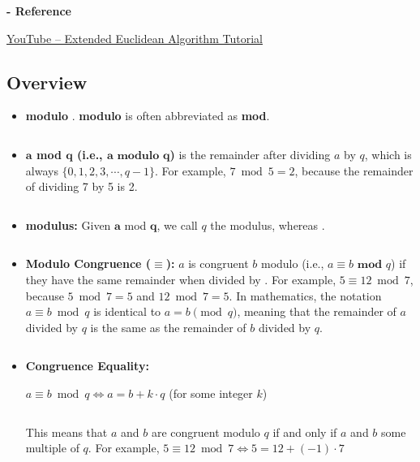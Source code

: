 
\noindent \textbf{- Reference} 

\href{https://www.youtube.com/watch?v=fz1vxq5ts5I}{YouTube -- Extended Euclidean Algorithm Tutorial}


\subsection{Overview}
\label{subsec:modulo-overview} 

\begin{tcolorbox}[title={\textbf{\tboxdef{\ref*{subsec:modulo-overview}} Integer Modulo}}]

\begin{itemize}

\item \textbf{modulo} . \textbf{modulo} is often abbreviated as \textbf{mod}.

$ $

\item \textbf{$\bm{a}$ mod $\bm{q}$ (i.e., $\bm{a} \bm{\text{ modulo } q}$)} is the remainder after dividing $a$ by $q$, which is always  $\{0, 1, 2, 3, \cdots, q-1\}$. For example, $7 \bmod 5 = 2$, because the remainder of dividing 7 by 5 is 2. 

$ $

\item \textbf{modulus:} Given $\bm{a}$ mod $\bm{q}$, we call  $q$ the modulus, whereas .

$ $

\item \textbf{Modulo Congruence ($\bm{\equiv}$):} $a$ is congruent  $b$ modulo  (i.e., $a \equiv b \textbf{ mod } q$) if they have the same remainder when divided by . For example, $5 \equiv 12 \bmod 7$, because $5 \bmod 7 = 5$ and $12 \bmod 7 = 5$. In mathematics, the notation $a \equiv b \bmod q$ is identical to $a = b \pmod q$, meaning that the remainder of $a$ divided by $q$ is the same as the remainder of $b$ divided by $q$. 

$ $

\item \textbf{Congruence \textit{} Equality:} 

$a \equiv b \bmod q \Longleftrightarrow a = b + k\cdot q$ \text{ } (for some integer $k$)

$ $

This means that $a$ and $b$ are congruent modulo $q$ if and only if $a$ and $b$  some multiple of $q$. For example, $5 \equiv 12 \bmod 7 \Longleftrightarrow 5 = 12 + (-1)\cdot 7$

\end{itemize}

\end{tcolorbox}


